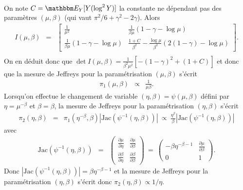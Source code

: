 \begin{rep}
\begin{eqnarray*}
\end{eqnarray*}
On note $C=\E_Y[ Y (\log^2 Y)]$ la constante ne dépendant pas des paramètres $(\mu,\beta)$ (qui vaut $\pi^2/6+\gamma^2-2\gamma$). Alors 
\begin{eqnarray*}
I(\mu,\beta)  & = & \displaystyle \left[ 
\begin{array}{ll}
\frac{1}{\mu^2} & \frac{1}{\beta\mu} \left(1-\gamma - \log\mu\right) \\
\frac{1}{\beta\mu} \left(1-\gamma - \log\mu\right)  &  \frac{1+C}{\beta^2} - \frac{\log \mu}{\beta^2}\left(2(1-\gamma) - \log \mu\right)
\end{array}
\right]. \\
\end{eqnarray*}
On en déduit donc que
$\det I(\mu,\beta)   =  \frac{1}{\beta^2 \mu^2} \left[-(1-\gamma)^2 + (1+C)\right]$
et donc que la mesure de Jeffreys pour la paramétrisation $(\mu,\beta)$ s'écrit
\begin{eqnarray*}
\pi_1(\mu,\beta) & \propto & \frac{1}{\mu\beta}.
\end{eqnarray*}
Lorsqu'on effectue le changement de variable $(\eta,\beta)=\psi(\mu,\beta)$ défini par
$\eta  =  \mu^{-\beta}$ et $\beta  =  \beta$,
la mesure de Jeffreys pour la paramétrisation $(\eta,\beta)$ s'écrit
\begin{eqnarray*}
\pi_2(\eta,\beta) & = & \pi_1(\eta^{-\beta},\beta) \left| \mbox{Jac}(\psi^{-1}(\eta,\beta)) \right| \ \propto \ 
\frac{\eta^{\beta}}{\beta} \left| \mbox{Jac}(\psi^{-1}(\eta,\beta)) \right|
\end{eqnarray*}
avec
\begin{eqnarray*}
\mbox{Jac}(\psi^{-1}(\eta,\beta)) & = & \left(\begin{array}{ll}
\frac{\partial \mu}{\partial \eta} & \frac{\partial \mu}{\partial \beta} \\
\frac{\partial \beta}{\partial \eta} & \frac{\partial \beta}{\partial \beta} 
\end{array}\right) \ = \ 
\left(\begin{array}{ll}
-\beta \eta^{-\beta-1} & \frac{\partial \mu}{\partial \beta} \\
0 & 1 
\end{array}\right).
\end{eqnarray*}
Donc 
$\left| \mbox{Jac}(\psi^{-1}(\eta,\beta)) \right|  =  \beta \eta^{-\beta-1}$
et la mesure de Jeffreys pour la paramétrisation $(\eta,\beta)$ s'écrit donc
$\pi_2(\eta,\beta)  \propto  1/\eta$.
\end{rep}